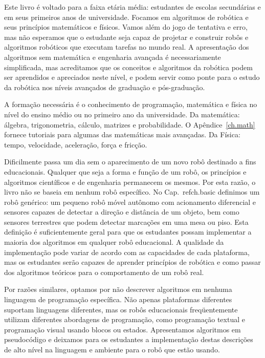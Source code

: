 Este livro é voltado para a faixa etária média: estudantes de escolas secundárias e em seus primeiros anos de universidade. Focamos em algoritmos de robótica e seus princípios matemáticos e físicos. Vamos além do jogo de tentativa e erro, mas não esperamos que o estudante seja capaz de projetar e construir robôs e algoritmos robóticos que executam tarefas no mundo real. A apresentação dos algoritmos sem matemática e engenharia avançada é necessariamente simplificada, mas acreditamos que os conceitos e algoritmos da robótica podem ser aprendidos e apreciados neste nível, e podem servir como ponte para o estudo da robótica nos níveis avançados de graduação e pós-graduação.

A formação necessária é o conhecimento de programação, matemática e física no nível do ensino médio ou no primeiro ano da universidade. Da matemática: álgebra, trigonometria, cálculo, matrizes e probabilidade. O Apêndice~\ref{ch.math} fornece tutoriais para algumas das matemáticas mais avançadas. Da Física: tempo, velocidade, aceleração, força e fricção.

Dificilmente passa um dia sem o aparecimento de um novo robô destinado a fins educacionais. Qualquer que seja a forma e função de um robô, os princípios e algoritmos científicos e de engenharia permanecem os mesmos. Por esta razão, o livro não se baseia em nenhum robô específico. No Cap.~ref{ch.basic} definimos um robô genérico: um pequeno robô móvel autônomo com acionamento diferencial e sensores capazes de detectar a direção e distância de um objeto, bem como sensores terrestres que podem detectar marcações em uma mesa ou piso. Esta definição é suficientemente geral para que os estudantes possam implementar a maioria dos algoritmos em qualquer robô educacional. A qualidade da implementação pode variar de acordo com as capacidades de cada plataforma, mas os estudantes serão capazes de aprender princípios de robótica e como passar dos algoritmos teóricos para o comportamento de um robô real.

Por razões similares, optamos por não descrever algoritmos em nenhuma linguagem de programação específica. Não apenas plataformas diferentes suportam linguagens diferentes, mas os robôs educacionais freqüentemente utilizam diferentes abordagens de programação, como programação textual e programação visual usando blocos ou estados. Apresentamos algoritmos em pseudocódigo e deixamos para os estudantes a implementação destas descrições de alto nível na linguagem e ambiente para o robô que estão usando.

